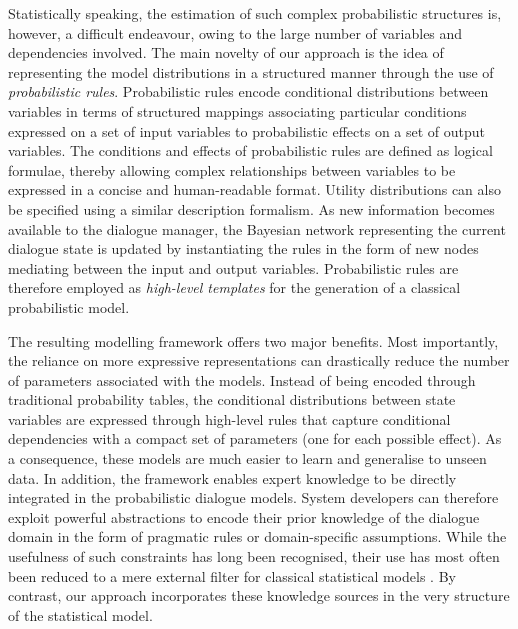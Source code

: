 Statistically speaking, the estimation of such complex probabilistic structures is, however, a difficult endeavour, owing to the large number of variables and dependencies involved. The main novelty of our approach is the idea of representing the model distributions in a structured manner through the use of \textit{probabilistic rules}.  Probabilistic rules encode conditional distributions between variables in terms of structured mappings associating particular conditions expressed on a set of input variables to probabilistic effects on a set of output variables. The conditions and effects of probabilistic rules are defined as logical formulae, thereby allowing complex relationships between variables to be expressed in a concise and human-readable format.  Utility distributions can also be specified using a similar description formalism. As new information becomes available to the dialogue manager, the Bayesian network representing the current dialogue state is updated by instantiating the rules in the form of new nodes mediating between the input and output variables. Probabilistic rules are therefore employed as \textit{high-level templates} for the generation of a classical probabilistic model.  

The resulting modelling framework offers two major benefits. Most importantly, the reliance on more expressive representations can drastically reduce the number of parameters associated with the models.  Instead of being encoded through traditional probability tables, the conditional distributions between state variables are expressed through high-level rules that capture conditional dependencies with a compact set of parameters (one for each possible effect). As a consequence, these models are much easier to learn and generalise to unseen data.  In addition, the framework enables expert knowledge to be directly integrated in the probabilistic dialogue models. System developers can therefore exploit powerful abstractions to encode their prior knowledge of the dialogue domain in the form of pragmatic rules or domain-specific assumptions.   While the usefulness of such constraints has long been recognised, their use has most often been reduced to a mere external filter for classical statistical models \citep{heeman2007,williams2008}. By contrast, our approach incorporates these knowledge sources in the very structure of the statistical model. 

